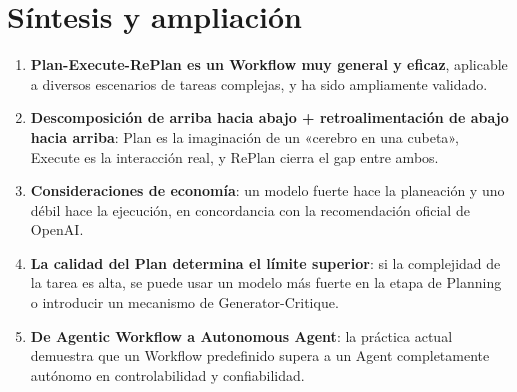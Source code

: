 \section{Síntesis y ampliación}

\begin{enumerate}
    \item \textbf{Plan-Execute-RePlan es un Workflow muy general y eficaz}, aplicable a diversos escenarios de tareas complejas, y ha sido ampliamente validado.
    \item \textbf{Descomposición de arriba hacia abajo + retroalimentación de abajo hacia arriba}: Plan es la imaginación de un «cerebro en una cubeta», Execute es la interacción real, y RePlan cierra el gap entre ambos.
    \item \textbf{Consideraciones de economía}: un modelo fuerte hace la planeación y uno débil hace la ejecución, en concordancia con la recomendación oficial de OpenAI.
    \item \textbf{La calidad del Plan determina el límite superior}: si la complejidad de la tarea es alta, se puede usar un modelo más fuerte en la etapa de Planning o introducir un mecanismo de Generator-Critique.
    \item \textbf{De Agentic Workflow a Autonomous Agent}: la práctica actual demuestra que un Workflow predefinido supera a un Agent completamente autónomo en controlabilidad y confiabilidad.
\end{enumerate}


